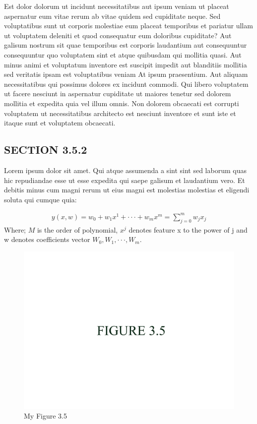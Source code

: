 \documentclass[a4paper,12pt]{report}
\begin{document}
Est dolor dolorum ut incidunt necessitatibus aut ipsum veniam ut placeat aspernatur eum vitae rerum ab vitae quidem sed cupiditate neque. Sed voluptatibus sunt ut corporis molestiae eum placeat temporibus et pariatur ullam ut voluptatem deleniti et quod consequatur eum doloribus cupiditate? Aut galisum nostrum sit quae temporibus est corporis laudantium aut consequuntur consequuntur quo voluptatem sint et atque quibusdam qui mollitia quasi. Aut minus animi et voluptatum inventore est suscipit impedit aut blanditiis mollitia sed veritatis ipsam est voluptatibus veniam At ipsum praesentium. Aut aliquam necessitatibus qui possimus dolores ex incidunt commodi. Qui libero voluptatem ut facere nesciunt in aspernatur cupiditate ut maiores tenetur sed dolorem mollitia et expedita quia vel illum omnis. Non dolorem obcaecati est corrupti voluptatem ut necessitatibus architecto est nesciunt inventore et sunt iste et itaque sunt et voluptatem obcaecati.  

\subsection{SECTION 3.5.2 }
\hspace{.5cm} Lorem ipsum dolor sit amet. Qui atque assumenda a sint sint sed laborum quas hic repudiandae esse ut esse expedita qui saepe galisum et laudantium vero. Et debitis minus cum magni rerum ut eius magni est molestias molestias et eligendi soluta qui cumque quia:

\begin{equation}
\begin{split}
y(x,w)=w_0+w_1x^1+\cdot\cdot\cdot+w_mx^m=\sum_{j=0}^{m} w_jx_j
 \end{split}
\end{equation}
  Where; $M$ is the order of polynomial, $x^j$  denotes feature x to the power of j and w denotes coefficients vector $W_0,W_1,\cdot\cdot\cdot,W_m$.
\begin{figure}[h]
        \centering
        \includegraphics[width=12cm]{fig_3.5.jpg}
        \caption{My Figure 3.5}
        \label{fig:my_label}
\end{figure}
\end{document}
